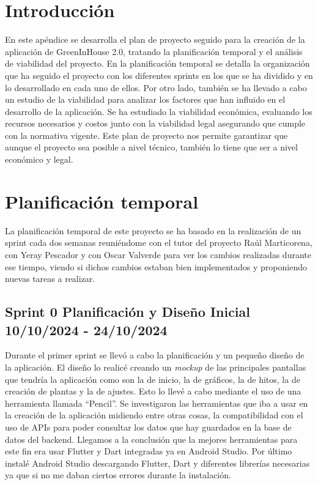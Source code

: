 
\section{Introducción}
En este apéndice se desarrolla el plan de proyecto seguido para la creación de la aplicación de GreenInHouse 2.0, tratando la planificación temporal y el análisis de viabilidad del proyecto. 
En la planificación temporal se detalla la organización que ha seguido el proyecto con los diferentes sprints en los que se ha dividido y en lo desarrollado en cada uno de ellos.
Por otro lado, también se ha llevado a cabo un estudio de la viabilidad para analizar los factores que han influido en el desarrollo de la aplicación. Se ha estudiado la viabilidad económica, evaluando los recursos necesarios y costos junto con la viabilidad legal asegurando que cumple con la normativa vigente.
Este plan de proyecto nos permite garantizar que aunque el proyecto sea posible a nivel técnico, también lo tiene que ser a nivel económico y legal.

\section{Planificación temporal}
La planificación temporal de este proyecto se ha basado en la realización de un sprint cada dos semanas reuniéndome con el tutor del proyecto Raúl Marticorena, con Yeray Pescador y con Oscar Valverde para ver los cambios realizadas durante ese tiempo, viendo si dichos cambios estaban bien implementados y proponiendo nuevas tareas a realizar.

\subsection{Sprint 0 Planificación y Diseño Inicial 10/10/2024 - 24/10/2024}
Durante el primer sprint se llevó a cabo la planificación y un pequeño diseño de la aplicación. El diseño lo realicé creando un \textit{mockup} de las principales pantallas que tendría la aplicación como son la de inicio, la de gráficos, la de hitos, la de creación de plantas y la de ajustes. Esto lo llevé a cabo mediante el uso de una herramienta llamada  ``Pencil''.
Se investigaron las herramientas que iba a usar en la creación de la aplicación midiendo entre otras cosas, la compatibilidad con el uso de APIs para poder consultar los datos que hay guardados en la base de datos del backend. Llegamos a la conclusión que la mejores herramientas para este fin era usar Flutter y Dart integradas ya en Android Studio. 
Por último instalé Android Studio descargando Flutter, Dart y diferentes librerías necesarias ya que si no me daban ciertos errores durante la instalación.

